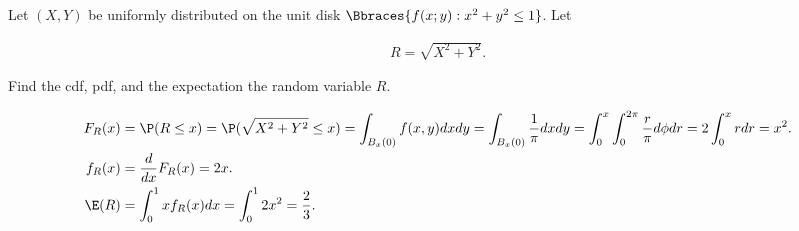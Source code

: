 
\begin{exercise}

Let $(X, Y)$ be uniformly distributed on the unit disk $\Bbraces{f(x; y): x^2 + y^2 \leq 1}$.
Let

\begin{align*}
    R = \sqrt{X^2 + Y^2}.
\end{align*}

Find the cdf, pdf, and the expectation the random variable $R$.

\end{exercise}


\begin{solution}

\begin{align*}
  F_R(x) &= \P(R \leq x) = \P(\sqrt{X^2 + Y^2} \leq x) = \int_{B_x(0)} f(x,y) dx dy
  = \int_{B_x(0)} \frac{1}{\pi} dx dy = \int_0^x\int_0^{2\pi} \frac{r}{\pi} d\phi dr
  = 2\int_0^x r dr = x^2. \\
  f_R(x) &= \frac{d}{dx}F_R(x) = 2x. \\
  \E(R) &= \int_0^1 x f_R(x) dx = \int_0^1 2x^2 = \frac{2}{3}.
\end{align*}

\end{solution}

